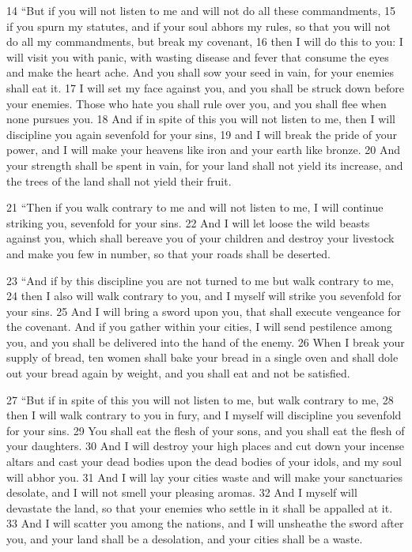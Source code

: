 \begin{bible}
14 ``But if you will not listen to me and will not do all these commandments, 15 if you spurn my statutes, and if your soul abhors my rules, so that you will not do all my commandments, but break my covenant, 16 then I will do this to you: I will visit you with panic, with wasting disease and fever that consume the eyes and make the heart ache. And you shall sow your seed in vain, for your enemies shall eat it. 17 I will set my face against you, and you shall be struck down before your enemies. Those who hate you shall rule over you, and you shall flee when none pursues you. 18 And if in spite of this you will not listen to me, then I will discipline you again sevenfold for your sins, 19 and I will break the pride of your power, and I will make your heavens like iron and your earth like bronze. 20 And your strength shall be spent in vain, for your land shall not yield its increase, and the trees of the land shall not yield their fruit.

21 ``Then if you walk contrary to me and will not listen to me, I will continue striking you, sevenfold for your sins. 22 And I will let loose the wild beasts against you, which shall bereave you of your children and destroy your livestock and make you few in number, so that your roads shall be deserted.

23 ``And if by this discipline you are not turned to me but walk contrary to me, 24 then I also will walk contrary to you, and I myself will strike you sevenfold for your sins. 25 And I will bring a sword upon you, that shall execute vengeance for the covenant. And if you gather within your cities, I will send pestilence among you, and you shall be delivered into the hand of the enemy. 26 When I break your supply of bread, ten women shall bake your bread in a single oven and shall dole out your bread again by weight, and you shall eat and not be satisfied.

27 ``But if in spite of this you will not listen to me, but walk contrary to me, 28 then I will walk contrary to you in fury, and I myself will discipline you sevenfold for your sins. 29 You shall eat the flesh of your sons, and you shall eat the flesh of your daughters. 30 And I will destroy your high places and cut down your incense altars and cast your dead bodies upon the dead bodies of your idols, and my soul will abhor you. 31 And I will lay your cities waste and will make your sanctuaries desolate, and I will not smell your pleasing aromas. 32 And I myself will devastate the land, so that your enemies who settle in it shall be appalled at it. 33 And I will scatter you among the nations, and I will unsheathe the sword after you, and your land shall be a desolation, and your cities shall be a waste.


\end{bible}
